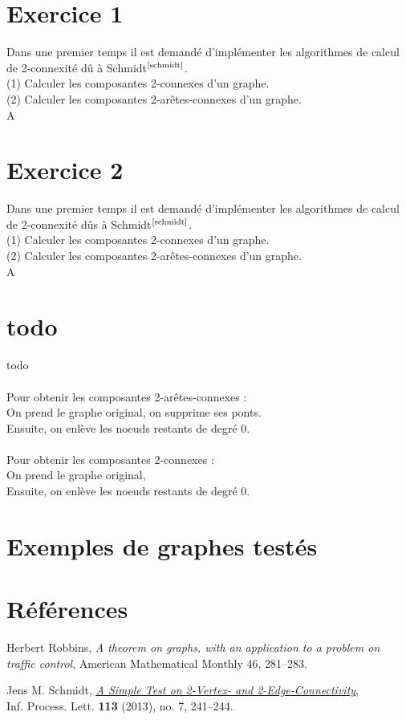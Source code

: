 \documentclass{article}      %
\begin{document}
\section{Exercice 1}
\textcolor{exogris}{
Dans une premier temps il est demandé d’implémenter les algorithmes de calcul de 2-connexité dû à Schmidt$^\text{\cite{schmidt}}$.
\\(1) Calculer les composantes 2-connexes d’un graphe.
\\(2) Calculer les composantes 2-arêtes-connexes d’un graphe.
}
\\A

\section{Exercice 2}
\textcolor{exogris}{
Dans une premier temps il est demandé d’implémenter les algorithmes de calcul de 2-connexité dûs à Schmidt$^\text{\cite{schmidt}}$.
\\(1) Calculer les composantes 2-connexes d’un graphe.
\\(2) Calculer les composantes 2-arêtes-connexes d’un graphe.
}
\\A

\section{todo}
todo
\\\\Pour obtenir les composantes 2-arêtes-connexes :
\\On prend le graphe original, on supprime ses ponts.
\\Ensuite, on enlève les noeuds restants de degré 0.
%
\\\\Pour obtenir les composantes 2-connexes :
\\On prend le graphe original, 
\\Ensuite, on enlève les noeuds restants de degré 0.
\section{Exemples de graphes testés}

\section{Références}
\begin{thebibliography}{9}
Herbert Robbins, \textit{A theorem on graphs, with an application to a problem on traffic control}, American Mathematical Monthly 46, 281–283.

Jens M. Schmidt, \href{https://arxiv.org/ftp/arxiv/papers/1209/1209.0700.pdf}{\underline{\textit{A Simple Test on 2-Vertex- and 2-Edge-Connectivity}}},
\\Inf. Process. Lett. \textbf{113} (2013), no. 7, 241–244.
\end{thebibliography}
\end{document}
